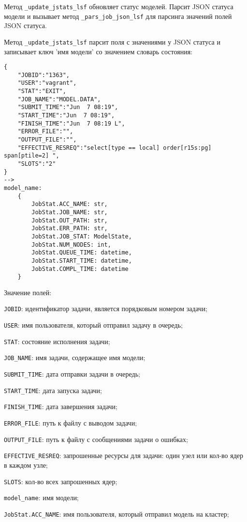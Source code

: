 Метод \lstinline{_update_jstats_lsf} обновляет статус моделей. Парсит JSON статуса модели и вызывает метод \lstinline{_pars_job_json_lsf} для парсинга значений полей JSON статуса.

Метод \lstinline{_update_jstats_lsf} парсит поля с значениями у JSON статуса и записывает ключ 'имя модели' со значением словарь состояния:

\begin{lstlisting}
{
    "JOBID":"1363",
    "USER":"vagrant",
    "STAT":"EXIT",
    "JOB_NAME":"MODEL.DATA",
    "SUBMIT_TIME":"Jun  7 08:19",
    "START_TIME":"Jun  7 08:19",
    "FINISH_TIME":"Jun  7 08:19 L",
    "ERROR_FILE":"",
    "OUTPUT_FILE":"",
    "EFFECTIVE_RESREQ":"select[type == local] order[r15s:pg] span[ptile=2] ",
    "SLOTS":"2"
}
-->
model_name:
    {
        JobStat.ACC_NAME: str,
        JobStat.JOB_NAME: str,
        JobStat.OUT_PATH: str,
        JobStat.ERR_PATH: str,
        JobStat.JOB_STAT: ModelState,
        JobStat.NUM_NODES: int,
        JobStat.QUEUE_TIME: datetime,
        JobStat.START_TIME: datetime,
        JobStat.COMPL_TIME: datetime
    }
\end{lstlisting}

Значение полей:

\lstinline{JOBID}: идентификатор задачи, является порядковым номером задачи;

\lstinline{USER}: имя пользователя, который отправил задачу в очередь;

\lstinline{STAT}: состояние исполнения задачи;

\lstinline{JOB_NAME}: имя задачи, содержащее имя модели;

\lstinline{SUBMIT_TIME}: дата отправки задачи в очередь;

\lstinline{START_TIME}: дата запуска задачи;

\lstinline{FINISH_TIME}: дата завершения задачи;

\lstinline{ERROR_FILE}: путь к файлу с выводом задачи;

\lstinline{OUTPUT_FILE}: путь к файлу с сообщениями задачи о ошибках;

\lstinline{EFFECTIVE_RESREQ}: запрошенные ресурсы для задачи: один узел или кол-во ядер в каждом узле;

\lstinline{SLOTS}: кол-во всех запрошенных ядер;

\lstinline{model_name}: имя модели;

\lstinline{JobStat.ACC_NAME}: имя пользователя, который отправил модель на кластер;

